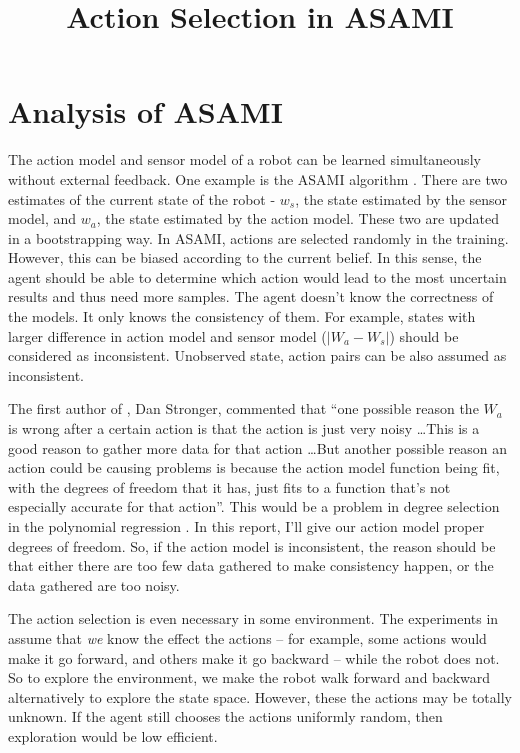 \documentclass[10pt]{article}
\title{Action Selection in ASAMI}
\date{}
\begin{document}
\maketitle


\section{Analysis of ASAMI}

The action model and sensor model of a robot can be learned
simultaneously without external feedback. One example is the ASAMI
algorithm \cite{CSJ06}. There are two estimates of the current state of the robot -
$w_s$, the state estimated by the sensor model, and $w_a$, the state
estimated by the action model. These two are updated in a
bootstrapping way. In ASAMI, actions are selected randomly
in the training. However, this can be biased according to the current
belief.  In this sense, the agent should be able to determine which
action would lead to the most uncertain results and thus need more
samples.  The agent doesn't know the correctness of the models. It
only knows the consistency of them. For example, states with larger
difference in action model and sensor model ($|W_a - W_s|$) should be
considered as inconsistent.  Unobserved state, action pairs can be
also assumed as inconsistent.

The first author of \cite{CSJ06}, Dan Stronger, commented that ``one
possible reason the $W_a$ is wrong after a certain action is that the
action is just very noisy \ldots This is a good reason to gather more
data for that action \ldots  But another possible reason  an action
could be causing problems is because the action model function being
fit, with the degrees of freedom that it has, just fits to a function
that's not especially accurate for that action''. This would be a
problem in degree selection in the polynomial regression
\cite{IJAIT08-stronger}. In this report, I'll give our action model
proper degrees of freedom. So, if the action model is inconsistent,
the reason should be that either there are too few data gathered to
make consistency happen, or the data gathered are too noisy.

The action selection is even necessary in some environment. The
experiments in \cite{CSJ06} assume that \textit{we} know the effect
the actions -- for example, some actions would make it go forward, and
others make it go backward -- while the robot does not. So to explore
the environment, we make the robot walk forward and backward
alternatively to explore the state space. However, these the actions
may be totally unknown.  If the agent still chooses the actions uniformly
random, then exploration would be low efficient.
\end{document}
